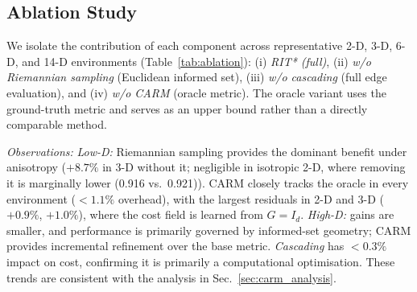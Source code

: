 \documentclass[journal]{IEEEtran}
\begin{document}
\begin{table}[t]
\centering
\caption{Ablation study: mean path cost ($\pm$ std) over 50 trials. \textbf{Bold}: best practical variant with complete success (oracle excluded).  ``w/o CARM'' uses the oracle metric. }
\label{tab:ablation}

\end{table}

\subsection{Ablation Study}\label{sec:ablation}

We isolate the contribution of each component across representative
2-D, 3-D, 6-D, and 14-D environments (Table~\ref{tab:ablation}):
(i) \emph{RIT* (full)}, (ii) \emph{w/o Riemannian sampling}
(Euclidean informed set), (iii) \emph{w/o cascading}
(full edge evaluation), and (iv) \emph{w/o CARM} (oracle metric).
The oracle variant uses the ground-truth metric and serves as an upper bound rather than a directly comparable method.

\textit{Observations:}
\emph{Low-D:} Riemannian sampling provides the dominant benefit under anisotropy ($+8.7\%$ in 3-D without it; negligible in isotropic 2-D, where removing it is marginally lower (0.916 vs.\ 0.921)).
CARM closely tracks the oracle in every environment ($<\!1.1\%$ overhead), with the largest residuals in 2-D and 3-D ($+0.9\%$, $+1.0\%$), where the cost field is learned from $G\!=\!I_d$.
\emph{High-D:} gains are smaller, and performance is primarily governed by informed-set geometry; CARM provides incremental refinement over the base metric.
\emph{Cascading} has $<0.3\%$ impact on cost, confirming it is primarily a computational optimisation. These trends are consistent with the analysis in Sec.~\ref{sec:carm_analysis}.
\end{document}
